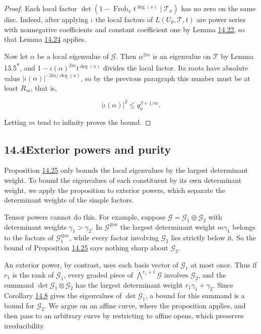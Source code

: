 \documentclass[11pt]{article}
\newcommand{\bpout}[1]{#1\textsuperscript{\hyperlink{bp-outside}{\ensuremath{\ast}}}}
\begin{document}
\begin{proof}[{Proof}]
Each local factor \(\det(1-\operatorname{Frob}_x t^{\deg(x)}\mid\mathcal T_{\bar x})\) has no zero on the same disc. Indeed, after applying \(\iota\) the local factors of \(L(U_0,\mathcal T,t)\) are power series with nonnegative coefficients and constant coefficient one by Lemma \hyperref[bp71]{14.22}, so that Lemma \hyperref[bp75]{14.24} applies.

Now let \(\alpha\) be a local eigenvalue of \(\mathcal G\). Then \(\alpha^{2m}\) is an eigenvalue on \(\mathcal T\) by Lemma \bpout{13.5}, and \(1-\iota(\alpha)^{2m}t^{\deg(x)}\) divides the local factor. Its roots have absolute value \(|\iota(\alpha)|^{-2m/\deg(x)}\), so by the previous paragraph this number must be at least \(R_m\), that is,

\[
|\iota(\alpha)|^2\le q_x^{\beta+1/m}.
\]

Letting \(m\) tend to infinity proves the bound.
\end{proof}


\subsection*{\texorpdfstring{14.4\quad Exterior powers and purity}{14.4 Exterior powers and purity}}
\label{bp80}%
\label{bp81}%
Proposition \hyperref[bp78]{14.25} only bounds the local eigenvalues by the largest determinant weight. To bound the eigenvalues of each constituent by its own determinant weight, we apply the proposition to exterior powers, which separate the determinant weights of the simple factors.

Tensor powers cannot do this. For example, suppose \(\mathcal G=\mathcal G_1\oplus\mathcal G_2\) with determinant weights \(\gamma_1>\gamma_2\). In \(\mathcal G^{\otimes m}\) the largest determinant weight \(m\gamma_1\) belongs to the factors of \(\mathcal G_1^{\otimes m}\), while every factor involving \(\mathcal G_2\) lies strictly below it. So the bound of Proposition \hyperref[bp78]{14.25} says nothing sharp about \(\mathcal G_2\).

An exterior power, by contrast, uses each basis vector of \(\mathcal G_1\) at most once. Thus if \(r_1\) is the rank of \(\mathcal G_1\), every graded piece of \(\bigwedge^{r_1+1}\mathcal G\) involves \(\mathcal G_2\), and the summand \(\det\mathcal G_1\otimes\mathcal G_2\) has the largest determinant weight \(r_1\gamma_1+\gamma_2\). Since Corollary \hyperref[bp27]{14.8} gives the eigenvalues of \(\det\mathcal G_1\), a bound for this summand is a bound for \(\mathcal G_2\). We argue on an affine curve, where the proposition applies, and then pass to an arbitrary curve by restricting to affine opens, which preserves irreducibility.
\end{document}
